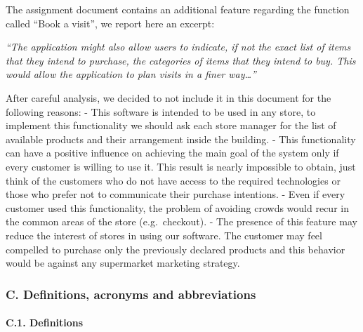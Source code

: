 \documentclass[
]{article}
\begin{document}
The assignment document contains an additional feature regarding the
function called ``Book a visit'', we report here an excerpt:

\emph{``The application might also allow users to indicate, if not the
exact list of items that they intend to purchase, the categories of
items that they intend to buy. This would allow the application to plan
visits in a finer way\ldots{}''}

After careful analysis, we decided to not include it in this document
for the following reasons: - This software is intended to be used in any
store, to implement this functionality we should ask each store manager
for the list of available products and their arrangement inside the
building. - This functionality can have a positive influence on
achieving the main goal of the system only if every customer is willing
to use it. This result is nearly impossible to obtain, just think of the
customers who do not have access to the required technologies or those
who prefer not to communicate their purchase intentions. - Even if every
customer used this functionality, the problem of avoiding crowds would
recur in the common areas of the store (e.g.~checkout). - The presence
of this feature may reduce the interest of stores in using our software.
The customer may feel compelled to purchase only the previously declared
products and this behavior would be against any supermarket marketing
strategy.

\hypertarget{c.-definitions-acronyms-and-abbreviations}{%
\subsubsection{C. Definitions, acronyms and
abbreviations}\label{c.-definitions-acronyms-and-abbreviations}}

\hypertarget{c.1.-definitions}{%
\paragraph{C.1. Definitions}\label{c.1.-definitions}}
\end{document}
